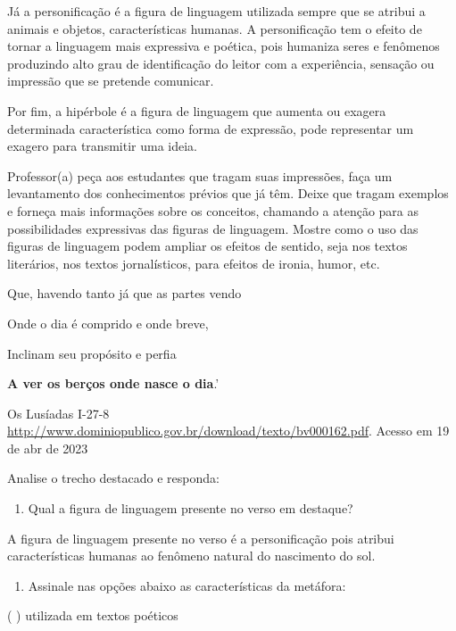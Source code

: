 {Já a personificação é a figura de linguagem utilizada sempre que se
atribui a animais e objetos, características humanas. A personificação
tem o efeito de tornar a linguagem mais expressiva e poética, pois
humaniza seres e fenômenos produzindo alto grau de identificação do
leitor com a experiência, sensação ou impressão que se pretende
comunicar.

Por fim, a hipérbole é a figura de linguagem que aumenta ou exagera
determinada característica como forma de expressão, pode representar um
exagero para transmitir uma ideia.

Professor(a) peça aos estudantes que tragam suas impressões, faça um
levantamento dos conhecimentos prévios que já têm. Deixe que tragam
exemplos e forneça mais informações sobre os conceitos, chamando a
atenção para as possibilidades expressivas das figuras de linguagem.
Mostre como o uso das figuras de linguagem podem ampliar os efeitos de
sentido, seja nos textos literários, nos textos jornalísticos, para
efeitos de ironia, humor, etc.


Que, havendo tanto já que as partes vendo

Onde o dia é comprido e onde breve,

Inclinam seu propósito e perfia

\textbf{A ver os berços onde nasce o dia}.'

Os Lusíadas I-27-8
\href{http://www.dominiopublico.gov.br/download/texto/bv000162.pdf}{\uline{http://www.dominiopublico.gov.br/download/texto/bv000162.pdf}}.
Acesso em 19 de abr de 2023

Analise o trecho destacado e responda:

\begin{enumerate}
\def\labelenumi{\arabic{enumi})}
\tightlist
\item
  Qual a figura de linguagem presente no verso em destaque?
\end{enumerate}

A figura de linguagem presente no verso é a personificação pois atribui
características humanas ao fenômeno natural do nascimento do sol.

\begin{enumerate}
\def\labelenumi{\arabic{enumi})}
\setcounter{enumi}{1}
\tightlist
\item
  Assinale nas opções abaixo as características da metáfora:
\end{enumerate}

( ) utilizada em textos poéticos

}
